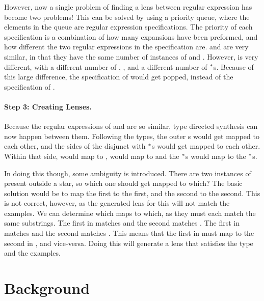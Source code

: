 \documentclass[numbers]{sigplanconf}
\begin{document}
However, now a single problem of finding a lens between regular expression has
become two problems!  This can be solved by using a priority queue, where the
elements in the queue are regular expression specifications.  The priority of
each specification is a combination of how many expansions have been preformed,
and how different the two regular expressions in the specification are.
 and  are very similar, in that they have the same
number of instances of  and .  However,  is
very different, with a different number of , , and a
different number of $^*$s.  Because of this large difference, the
specification of  would get popped, instead of the
specification of .

\paragraph*{Step 3: Creating Lenses.}
Because the regular expressions of   and  are so
similar, type directed synthesis can now happen between them.
Following the types, the outer s
would get mapped to each other, and the sides of the disjunct with $^*$s
would get mapped to each other.  Within that side,  would map to
,  would map to  and the $^*$s would map to the
$^*$s.

In doing this though, some ambiguity is introduced.  There are two
instances of  present outside a star, so which one should get mapped to
which?  The basic solution would be to map the first to the first, and the
second to the second.  This is not correct, however, as the generated lens for
this will not match the examples.  We can determine which maps to which, as they
must each match the same substrings.  The first  in 
matches  and the second matches .  The first  in
 matches  and the second matches .
This means that the first  in  must map to the second
 in , and vice-versa.  Doing this will generate a lens
that satisfies the type and the examples.

\section{Background}
\end{document}
